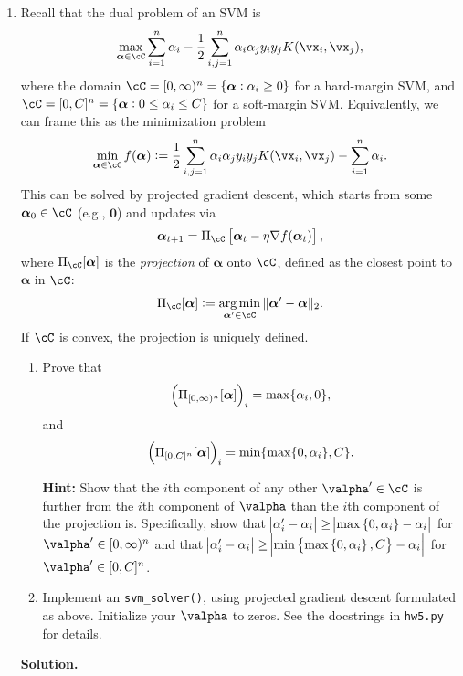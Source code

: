 \documentclass{article}
\def\balpha{\boldsymbol{\alpha}}
\DeclareMathOperator*{\argmin}{arg\,min}
\theoremstyle{definition}
\theoremstyle{remark}
\newenvironment{Q}
{%
\clearpage
\item
}
{%
\phantom{s}%
\bigskip%
\noindent\textbf{Solution.}
}
\begin{document}
\begin{enumerate}[font={\Large\bfseries},left=0pt]
\begin{Q}
    Recall that the dual problem of an SVM is
    \begin{align*}
        \max_{\balpha\in\cC}\sum_{i=1}^{n}\alpha_i-\frac{1}{2}\sum_{i,j=1}^{n}\alpha_i\alpha_jy_iy_jK(\vx_i,\vx_j),
    \end{align*}
    where the domain $\cC=[0,\infty)^n=\{\balpha:\alpha_i\ge0\}$ for a  hard-margin SVM, and $\cC=[0,C]^n=\{\balpha:0\le\alpha_i\le C\}$ for a soft-margin SVM. Equivalently, we can frame this as the minimization problem
    \begin{align*}
        \min_{\balpha\in\cC}f(\balpha):=\frac{1}{2}\sum_{i,j=1}^{n}\alpha_i\alpha_jy_iy_jK(\vx_i,\vx_j)-\sum_{i=1}^{n}\alpha_i.
    \end{align*}
    This can be solved by projected gradient descent, which starts from some $\balpha_0\in\cC$ (e.g., $\boldsymbol{0}$) and updates via
    \begin{align*}
        \balpha_{t+1}=\Pi_{\cC}\sbr{\balpha_t-\eta\nabla f(\balpha_t)},
    \end{align*}
    where $\Pi_{\cC}[\balpha]$ is the \emph{projection} of $\balpha$ onto $\cC$, defined as the closest point to $\balpha$ in $\cC$:
    \begin{align*}
        \Pi_{\cC}[\balpha]:=\argmin_{\balpha'\in\cC}\|\balpha'-\balpha\|_2.
    \end{align*}
    If $\cC$ is convex, the projection is uniquely defined.

    \begin{enumerate}
        \item Prove that
        \begin{align*}
            \del{\Pi_{[0,\infty)^n}[\balpha]}_i=\max\{\alpha_i,0\},
        \end{align*}
        and
        \begin{align*}
            \del{\Pi_{[0,C]^n}[\balpha]}_i=\min\{\max\{0,\alpha_i\},C\}.
        \end{align*}
        
        \textbf{Hint:} Show that the $i$th component of any other $\valpha' \in \cC$ is further from the $i$th component of $\valpha$ than the $i$th component of the projection is. Specifically, show that $\abs{\alpha'_i - \alpha_i} \ge \abs{\max\cbr{0, \alpha_i} - \alpha_i}$ for $\valpha' \in [0,\infty)^n$ and that $\abs{\alpha'_i - \alpha_i} \ge \abs{\min\cbr{\max\cbr{0, \alpha_i}, C} - \alpha_i}$ for $\valpha' \in [0,C]^n$.

        \item Implement an \texttt{svm\_solver()}, using projected gradient descent formulated as above. Initialize your $\valpha$ to zeros. See the docstrings in \texttt{hw5.py} for details.
        

\end{enumerate}
\end{Q}
\end{enumerate}
\end{document}
